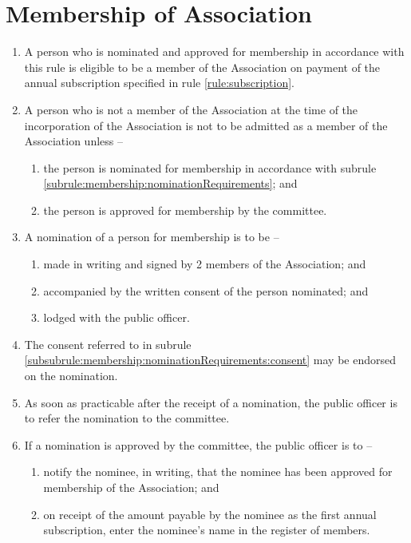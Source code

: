 \section{Membership of Association}
\label{rule:membership}

\begin{enumerate}
	\item A person who is nominated and approved for membership in accordance with this rule is eligible to be a member of the Association on payment of the annual subscription specified in rule \ref{rule:subscription}.
	
	\item A person who is not a member of the Association at the time of the incorporation of the Association is not to be admitted as a member of the Association unless --
	\begin{enumerate}
		\item the person is nominated for membership in accordance with subrule \ref{subrule:membership:nominationRequirements}; and
		\item the person is approved for membership by the committee.
	\end{enumerate}
	
	\item \label{subrule:membership:nominationRequirements} A nomination of a person for membership is to be --
	\begin{enumerate}
		\item made in writing and signed by 2 members of the Association; and
		\item \label{subsubrule:membership:nominationRequirements:consent} accompanied by the written consent of the person nominated; and
		\item lodged with the public officer.
	\end{enumerate}
	
	\item The consent referred to in subrule \ref{subsubrule:membership:nominationRequirements:consent} may be endorsed on the nomination.
	\item As soon as practicable after the receipt of a nomination, the public officer is to refer the nomination to the committee.
	
	\item If a nomination is approved by the committee, the public officer is to --
	\begin{enumerate}
		\item notify the nominee, in writing, that the nominee has been approved for membership of the Association; and
		\item on receipt of the amount payable by the nominee as the first annual subscription, enter the nominee's name in the register of members.
	\end{enumerate}
	

\end{enumerate}
